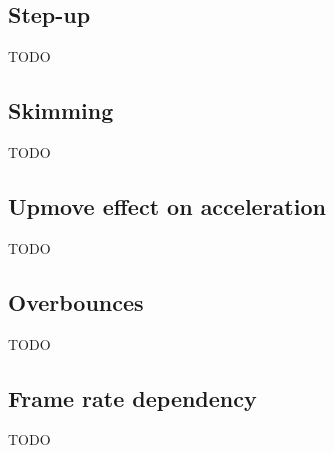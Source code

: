 \subsection{Step-up}
\label{sec:stepup}
TODO

\subsection{Skimming}
\label{sec:skimming}
TODO

\subsection{Upmove effect on acceleration}
\label{sec:upmove}
TODO

\subsection{Overbounces}
\label{sec:overbounce}
TODO

\subsection{Frame rate dependency}
\label{sec:framerate}
TODO
